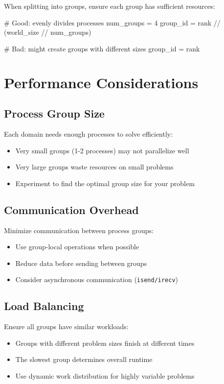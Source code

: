 When splitting into groups, ensure each group has sufficient resources:
\begin{python}
# Good: evenly divides processes
num_groups = 4
group_id = rank // (world_size // num_groups)

# Bad: might create groups with different sizes
group_id = rank %
\end{python}

\section{Performance Considerations}

\subsection{Process Group Size}

Each domain needs enough processes to solve efficiently:
\begin{itemize}
\item Very small groups (1-2 processes) may not parallelize well
\item Very large groups waste resources on small problems
\item Experiment to find the optimal group size for your problem
\end{itemize}

\subsection{Communication Overhead}

Minimize communication between process groups:
\begin{itemize}
\item Use group-local operations when possible
\item Reduce data before sending between groups
\item Consider asynchronous communication (\texttt{isend/irecv})
\end{itemize}

\subsection{Load Balancing}

Ensure all groups have similar workloads:
\begin{itemize}
\item Groups with different problem sizes finish at different times
\item The slowest group determines overall runtime
\item Use dynamic work distribution for highly variable problems
\end{itemize}


